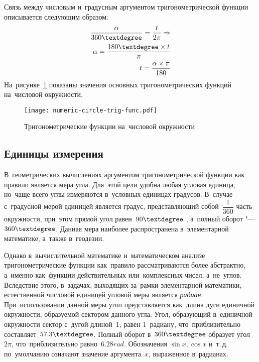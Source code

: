 \documentclass[]{scrartcl}
\begin{document}
%
Связь между числовым и~градусным аргументом тригонометрической функции описывается следующим образом:
\begin{equation}\label{eq:numeric-and-angle-argument-link}
	\begin{aligned}
	\frac{\alpha}{360 \textdegree} = \frac{t}{2 \pi} \Rightarrow\\
	\alpha = \frac{180 \textdegree \times t}{\pi}\\
	t = \frac{\alpha \times \pi}{180}
	\end{aligned}
\end{equation}
На~рисунке~\ref{fig:numeric-circle-trig-func} показаны значения основных тригонометрических функций на~числовой окружности.
%
\begin{figure}[ht]
	\centering %
	\texttt{[image: numeric-circle-trig-func.pdf]}
	\caption{Тригонометрические функции на~числовой окружности}\label{fig:numeric-circle-trig-func}
\end{figure}
%
\subsection{Единицы измерения}
В~геометрических вычислениях аргументом тригонометрической функции как правило является мера угла. Для~этой цели удобна любая угловая единица, но~чаще всего углы измеряются в~условных единицах градусов. В~случае с~градусной мерой единицей является градус, представляющий собой~${\textstyle \dfrac{1}{360}}$ часть окружности, при~этом прямой угол равен~${\textstyle 90 \textdegree}$ , а~полный оборот "--- ${\textstyle 360 \textdegree}$. Данная мера наиболее распространена в~элементарной математике, а~также в~геодезии. 

Однако в~вычислительной математике и~математическом анализе тригонометрические функции как~правило рассматриваются более абстрактно, а~именно как~функции действительных или~комплексных чисел, а~не~углов. Вследствие этого, в~задачах, выходящих за~рамки элементарной математики, естественной числовой единицей угловой меры является \emph{радиан}. При~использовании данной меры угол представляется как~длина дуги единичной окружности, образуемой сектором данного угла. Угол, образующий в~единичной окружности сектор с~дугой длиной~1, равен 1~радиану, что~приблизительно составляет~${\textstyle 57.3 \textdegree}$. Полный оборот в~${\textstyle 360 \textdegree}$ образует угол~${\textstyle 2 \pi}$, что~приблизительно равно~${\textstyle 6.28 rad}$. Обозначения ${\textstyle \sin x, \cos x}$ и~т.\,д. по~умолчанию означают значение аргумента~${\textstyle x}$, выраженное в~радианах.
\end{document}

